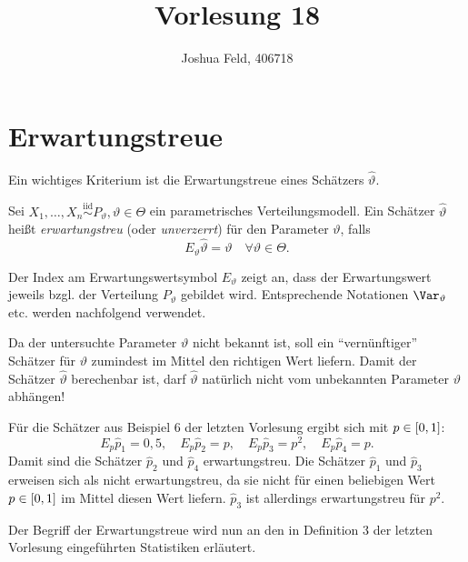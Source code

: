 \documentclass{lecture}
\institute{Institut für Statistik und Wirtschaftsmathematik}
\title{Vorlesung 18}
\author{Joshua Feld, 406718}
\begin{document}
    \maketitle

    
    \section*{Erwartungstreue}

    Ein wichtiges Kriterium ist die Erwartungstreue eines Schätzers \(\hat{\vartheta}\).
    
    \begin{definition}
        Sei \(X_1, \ldots, X_n \stackrel{\text{iid}}{\sim} P_\vartheta, \vartheta \in \Theta\) ein parametrisches Verteilungsmodell.
        Ein Schätzer \(\hat{\vartheta}\) heißt \emph{erwartungstreu} (oder \emph{unverzerrt}) für den Parameter \(\vartheta\), falls
        \[
            E_\vartheta \hat{\vartheta} = \vartheta \quad \forall \vartheta \in \Theta.
        \]
    \end{definition}
    
    Der Index am Erwartungswertsymbol \(E_\vartheta\) zeigt an, dass der Erwartungswert jeweils bzgl. der Verteilung \(P_\vartheta\) gebildet wird.
    Entsprechende Notationen \(\Var_\vartheta\) etc. werden nachfolgend verwendet.
    
    Da der untersuchte Parameter \(\vartheta\) nicht bekannt ist, soll ein ``vernünftiger'' Schätzer für \(\vartheta\) zumindest im Mittel den richtigen Wert liefern.
    Damit der Schätzer \(\hat{\vartheta}\) berechenbar ist, darf \(\hat{\vartheta}\) natürlich nicht vom unbekannten Parameter \(\vartheta\) abhängen!

    \begin{example}
        Für die Schätzer aus Beispiel 6 der letzten Vorlesung ergibt sich mit \(p \in \brackets*{0, 1}\):
        \[
            E_p \hat{p}_1 = 0,5, \quad E_p \hat{p}_2 = p, \quad E_p \hat{p}_3 = p^2, \quad E_p \hat{p}_4 = p.
        \]
        Damit sind die Schätzer \(\hat{p}_2\) und \(\hat{p}_4\) erwartungstreu.
        Die Schätzer \(\hat{p}_1\) und \(\hat{p}_3\) erweisen sich als nicht erwartungstreu, da sie nicht für einen beliebigen Wert \(p \in \brackets*{0, 1}\) im Mittel diesen Wert liefern.
        \(\hat{p}_3\) ist allerdings erwartungstreu für \(p^2\).
    \end{example}

    Der Begriff der Erwartungstreue wird nun an den in Definition 3 der letzten Vorlesung eingeführten Statistiken erläutert.
\end{document}
